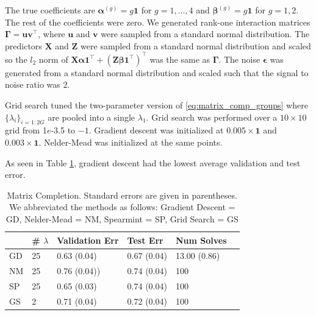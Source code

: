 \documentclass[12pt]{article}
\begin{document}
The true coefficients are $\boldsymbol{\alpha}^{(g)} = g \boldsymbol{1}$ for $g = 1,...,4$ and $\boldsymbol{\beta}^{(g)} = g \boldsymbol{1}$ for $g = 1,2$. The rest of the coefficients were zero. We generated rank-one interaction matrices $\boldsymbol{\Gamma} = \boldsymbol{u}\boldsymbol{v}^\top$, where $\boldsymbol{u}$ and $\boldsymbol{v}$ were sampled from a standard normal distribution. The predictors $\boldsymbol X$ and $\boldsymbol{Z}$ were sampled from a standard normal distribution and scaled so the $l_2$ norm of $\boldsymbol{X}\boldsymbol{\alpha}\boldsymbol{1}^\top + (\boldsymbol{Z}\boldsymbol{\beta}\boldsymbol{1}^\top)^\top$ was the same as $\boldsymbol{\Gamma}$.
The noise $\boldsymbol \epsilon$ was generated from a standard normal distribution and scaled such that the signal to noise ratio was 2. 


Grid search tuned the two-parameter version of \eqref{eq:matrix_comp_groups} where $\{\lambda_i\}_{i=1:2G}$ are pooled into a single $\lambda_1$. Grid search was performed over a $10 \times 10$ grid from 1$e$-3.5 to $-1$. Gradient descent was initialized at $0.005 \times \boldsymbol 1$ and $0.003 \times \boldsymbol 1$. Nelder-Mead was initialized at the same points.

As seen in Table \ref{table:matrix_completion}, gradient descent had the lowest average validation and test error.

\begin{table}
	\caption{\label{table:matrix_completion} Matrix Completion. Standard errors are given in parentheses. We abbreviated the methods as follows: Gradient Descent = GD, Nelder-Mead = NM, Spearmint = SP, Grid Search = GS}
	\centering
		\begin{tabular}{| l | l | l | l | l | l | }
		\hline
		& \# $\lambda$ & Validation Err & Test Err & Num Solves\\
		\hline
		GD & 25 & 0.63 (0.04) & 0.67 (0.04) & 13.00 (0.86)\\
		\hline
		NM & 25 & 0.76 (0.04)) & 0.74 (0.04) & 100 \\
		\hline
		SP & 25 & 0.65 (0.03) & 0.74 (0.04) & 100\\
		\hline
		GS & 2 & 0.71 (0.04) & 0.72 (0.04) & 100\\
		\hline
	\end{tabular}
\end{table}
\end{document}
